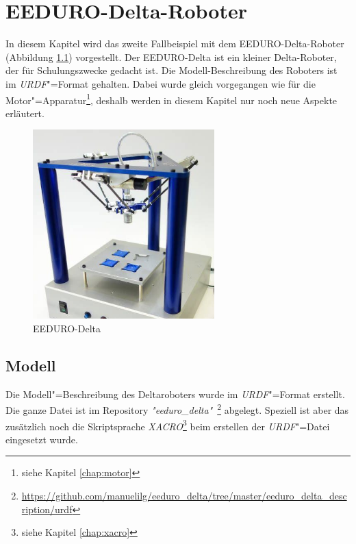 \chapter{EEDURO-Delta-Roboter}
In diesem Kapitel wird das zweite Fallbeispiel mit dem EEDURO-Delta-Roboter (Abbildung \ref{Ab:eeduro}) vorgestellt.
Der EEDURO-Delta ist ein kleiner Delta-Roboter, der für Schulungszwecke gedacht ist.
Die Modell-Beschreibung des Roboters ist im \textit{URDF}"=Format gehalten.
Dabei wurde gleich vorgegangen wie für die Motor"=Apparatur\footnote{siehe Kapitel \ref{chap:motor}}, deshalb werden in diesem Kapitel nur noch neue Aspekte erläutert.
\begin{figure}[ht!]
	\centering
	\includegraphics[width=7cm]{images/eeduro_delta.png}
	\caption{EEDURO-Delta \cite{eeduro}}
	\label{Ab:eeduro}
\end{figure}

\section{Modell}
\label{chap:delta-modell}
Die Modell"=Beschreibung des Deltaroboters wurde im \textit{URDF}"=Format erstellt.
Die ganze Datei ist im Repository \textit{\textit{"}eeduro\_delta\textit{"}}~\footnote{\url{https://github.com/manuelilg/eeduro_delta/tree/master/eeduro_delta_description/urdf}} abgelegt.
Speziell ist aber das zusätzlich noch die Skriptsprache \textit{XACRO}\footnote{siehe Kapitel \ref{chap:xacro}} beim erstellen der \textit{URDF}"=Datei eingesetzt wurde.

%


